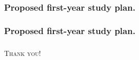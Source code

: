 \documentclass[first,firstsupp,lastsupp,handout,last,hyperref,table]{ETHclass}
\begin{document}
\begin{frame}
\frametitle{Proposed first-year study plan.}
\vspace{-.6cm}
\centering

\end{frame}

\begin{frame}
\frametitle{Proposed first-year study plan.}
\vspace{-.6cm}
\centering

\end{frame}

\begin{frame}[plain]
\frametitle{}
\vspace{1cm}
\centering
{\LARGE
\textsc{Thank you!}
}
\end{frame}







%        
%          

\begin{frame}[plain]
\frametitle{}
\end{frame}
\end{document}
